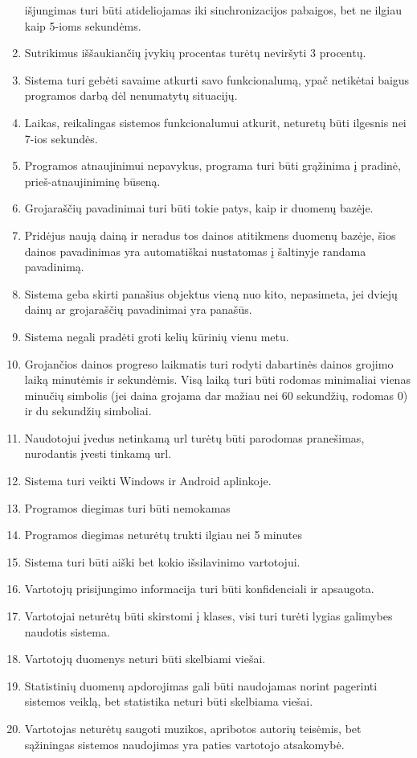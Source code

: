 \documentclass{VUMIFPSkursinis}
\begin{document}
\begin{enumerate}[start=1,label={\bfseries NFR\arabic*}]
išjungimas turi būti atideliojamas iki sinchronizacijos pabaigos, bet ne ilgiau kaip 5-ioms sekundėms. 
\item Sutrikimus iššaukiančių įvykių procentas turėtų neviršyti 3 procentų. 
\item Sistema turi gebėti savaime atkurti savo funkcionalumą, ypač netikėtai baigus programos darbą dėl nenumatytų situacijų. 
\item Laikas, reikalingas sistemos funkcionalumui atkurit, neturetų būti ilgesnis nei 7-ios sekundės.
\item Programos atnaujinimui nepavykus, programa turi būti grąžinima į pradinė, prieš-atnaujiniminę būseną.
\item Grojaraščių pavadinimai turi būti tokie patys, kaip ir duomenų bazėje. 
\item Pridėjus naują dainą ir neradus tos dainos atitikmens duomenų bazėje, šios dainos pavadinimas yra automatiškai nustatomas į šaltinyje randama pavadinimą. 
\item Sistema geba skirti panašius objektus vieną nuo kito, nepasimeta, jei dviejų dainų ar grojaraščių pavadinimai yra panašūs.
\item Sistema negali pradėti groti kelių kūrinių vienu metu.
\item Grojančios dainos progreso laikmatis turi rodyti dabartinės dainos grojimo laiką minutėmis ir sekundėmis. Visą laiką turi būti rodomas minimaliai vienas minučių simbolis 
(jei daina grojama dar mažiau nei 60 sekundžių, rodomas 0) ir du sekundžių simboliai. 
\item Naudotojui įvedus netinkamą url turėtų būti parodomas pranešimas, nurodantis įvesti tinkamą url. 
\item Sistema turi veikti Windows ir Android aplinkoje.
\item Programos diegimas turi būti nemokamas
\item Programos diegimas neturėtų trukti ilgiau nei 5 minutes
\item Sistema turi būti aiški bet kokio išsilavinimo vartotojui.
\item Vartotojų prisijungimo informacija turi būti konfidenciali ir apsaugota.
\item Vartotojai neturėtų būti skirstomi į klases, visi turi turėti lygias galimybes naudotis sistema.
\item Vartotojų duomenys neturi būti skelbiami viešai.
\item Statistinių duomenų apdorojimas gali būti naudojamas norint pagerinti sistemos veiklą, bet statistika neturi būti skelbiama viešai.
\item Vartotojas neturėtų saugoti muzikos, apribotos autorių teisėmis, bet sąžiningas sistemos naudojimas yra paties vartotojo atsakomybė.
\end{enumerate}
\end{document}
